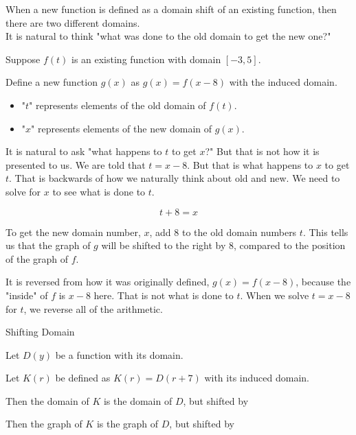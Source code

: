 \documentclass{ximera}
\begin{document}
When a new function is defined as a domain shift of an existing function, then there are two different domains.  \\


It is natural to think "what was done to the old domain to get the new one?"

Suppose $f(t)$ is an existing function with domain $[-3, 5]$.

Define a new function $g(x)$ as $g(x) = f(x-8)$ with the induced domain.



\begin{itemize}
\item "$t$" represents elements of the old domain of $f(t)$.  
\item "$x$" represents elements of the new domain of $g(x)$.  
\end{itemize}




It is natural to ask "what happens to $t$ to get $x$?"  But that is not how it is presented to us.  We are told that $t=x-8$.  But that is what happens to $x$ to get $t$.  That is backwards of how we naturally think about old and new.  We need to solve for $x$ to see what is done to $t$.

\[ t+8=x \]

To get the new domain number, $x$, add $8$ to the old domain numbers $t$.  This tells us that the graph of $g$ will be shifted to the right by $8$, compared to the position of the graph of $f$.


It is reversed from how it was originally defined, $g(x) = f(x-8)$, because the "inside" of $f$ is $x-8$ here.  That is not what is done to $t$.  When we solve $t=x-8$ for $t$, we reverse all of the arithmetic.




\begin{example} Shifting Domain


Let $D(y)$ be a function with its domain.

Let $K(r)$ be defined as $K(r) = D(r+7)$ with its induced domain.


Then the domain of $K$ is the domain of $D$, but shifted  by 


Then the graph of $K$ is the graph of $D$, but shifted  by 




\end{example}
\end{document}
